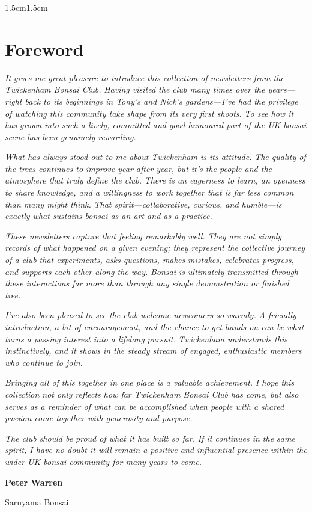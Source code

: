 \begin{adjustwidth}{1.5cm}{1.5cm}
    \chapter*{Foreword}
    \textit{It gives me great pleasure to introduce this collection of newsletters from the Twickenham Bonsai Club.}
    \textit{Having visited the club many times over the years---right back to its beginnings in Tony's and Nick's gardens---I've had the privilege of watching this community take shape from its very first shoots.}
    \textit{To see how it has grown into such a lively, committed and good\--humoured part of the UK bonsai scene has been genuinely rewarding.}

    \null
    \textit{What has always stood out to me about Twickenham is its attitude.}
    \textit{The quality of the trees continues to improve year after year, but it's the people and the atmosphere that truly define the club.}
    \textit{There is an eagerness to learn, an openness to share knowledge, and a willingness to work together that is far less common than many might think.}
    \textit{That spirit---collaborative, curious, and humble---is exactly what sustains bonsai as an art and as a practice.}

    \null
    \textit{These newsletters capture that feeling remarkably well.}
    \textit{They are not simply records of what happened on a given evening; they represent the collective journey of a club that experiments, asks questions, makes mistakes, celebrates progress, and supports each other along the way.}
    \textit{Bonsai is ultimately transmitted through these interactions far more than through any single demonstration or finished tree.}

    \null
    \textit{I've also been pleased to see the club welcome newcomers so warmly.}
    \textit{A friendly introduction, a bit of encouragement, and the chance to get hands\--on can be what turns a passing interest into a lifelong pursuit.}
    \textit{Twickenham understands this instinctively, and it shows in the steady stream of engaged, enthusiastic members who continue to join.}

    \null
    \textit{Bringing all of this together in one place is a valuable achievement.}
    \textit{I hope this collection not only reflects how far Twickenham Bonsai Club has come, but also serves as a reminder of what can be accomplished when people with a shared passion come together with generosity and purpose.}

    \null
    \textit{The club should be proud of what it has built so far.}
    \textit{If it continues in the same spirit, I have no doubt it will remain a positive and influential presence within the wider UK bonsai community for many years to come.}

    \null
    \hfill \textbf{Peter Warren}

    \hfill Saruyama Bonsai
\end{adjustwidth}
